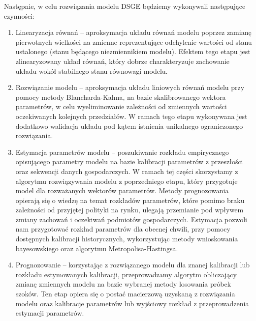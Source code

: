 Następnie, w celu rozwiązania modelu DSGE będziemy wykonywali następujące czynności:
\begin{enumerate}
    \item Linearyzacja równań -- aproksymacja układu równań modelu poprzez zamianę pierwotnych wielkości na zmienne reprezentujące odchylenie wartości od stanu ustalonego (stanu będącego niezmiennikiem modelu). Efektem tego etapu jest zlinearyzowany układ równań, który dobrze charakteryzuje zachowanie układu wokół stabilnego stanu równowagi modelu.
    \item Rozwiązanie modelu -- aproksymacja układu liniowych równań modelu przy pomocy metody Blancharda-Kahna, na bazie skalibrowanego wektora parametrów, w celu wyeliminowanie zależności od zmiennych wartości oczekiwanych kolejnych przedziałów. W ramach tego etapu wykonywana jest dodatkowo walidacja układu pod kątem istnienia unikalnego ograniczonego rozwiązania.
    \item Estymacja parametrów modelu -- poszukiwanie rozkładu empirycznego opisującego parametry modelu na bazie kalibracji parametrów z przeszłości oraz sekwencji danych gospodarczych. W ramach tej części skorzystamy z algorytmu rozwiązywania modelu z poprzedniego etapu, który przygotuje model dla rozważanych wektorów parametrów. Metody prognozowania opierają się o wiedzę na temat rozkładów parametrów, które pomimo braku zależności od przyjętej polityki na rynku, ulegają przemianie pod wpływem zmiany zachowań i oczekiwań podmiotów gospodarczych. Estymacja pozwoli nam przygotować rozkład parametrów dla obecnej chwili, przy pomocy dostępnych kalibracji historycznych, wykorzystując metody wnioskowania bayesowskiego oraz algorytmu Metropolisa-Hastingsa.
    \item Prognozowanie -- korzystając z rozwiązanego modelu dla znanej kalibracji lub rozkładu estymowanych kalibracji, przeprowadzamy algorytm obliczający zmianę zmiennych modelu na bazie wybranej metody losowania próbek szoków. Ten etap opiera się o postać macierzową uzyskaną z rozwiązania modelu oraz kalibracje parametrów lub wyjściowy rozkład z przeprowadzenia estymacji parametrów.
    
    
    
\end{enumerate}

